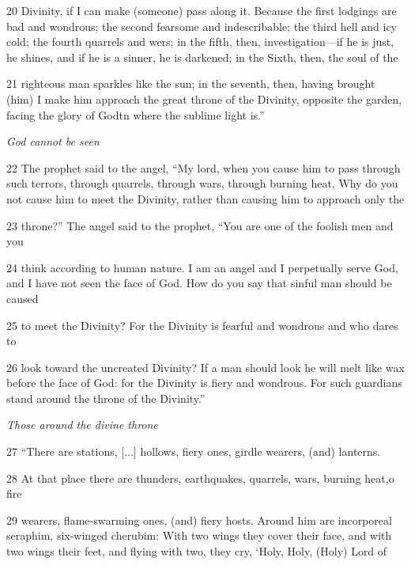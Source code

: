 \par 20 Divinity, if I can make (someone) pass along it. Because the first lodgings are bad and wondrous; the second fearsome and indescribable; the third hell and icy cold; the fourth quarrels and wers; in the fifth, then, investigation—if he is just, he shines, and if he is a sinner, he is darkened; in the Sixth, then, the soul of the

\par 21 righteous man sparkles like the sun; in the seventh, then, having brought (him) I make him approach the great throne of the Divinity, opposite the garden, facing the glory of Godtn where the sublime light is.”

\par \textit{God cannot be seen}

\par 22 The prophet said to the angel, “My lord, when you cause him to pass through such terrors, through quarrels, through wars, through burning heat, Why do you not cause him to meet the Divinity, rather than causing him to approach only the

\par 23 throne?” The angel said to the prophet, “You are one of the foolish men and you

\par 24 think according to human nature. I am an angel and I perpetually serve God, and I have not seen the face of God. How do you say that sinful man should be caused

\par 25 to meet the Divinity? For the Divinity is fearful and wondrous and who dares to

\par 26 look toward the uncreated Divinity? If a man should look he will melt like wax before the face of God: for the Divinity is fiery and wondrous. For such guardians stand around the throne of the Divinity.”

\par \textit{Those around the divine throne}

\par 27 “There are stations, [...] hollows, fiery ones, girdle wearers, (and) lanterns.

\par 28 At that place there are thunders, earthquakes, quarrels, wars, burning heat,o fire

\par 29 wearers, flame-swarming ones, (and) fiery hosts. Around him are incorporeal seraphim, six-winged cherubim: With two wings they cover their face, and with two wings their feet, and flying with two, they cry, ‘Holy, Holy, (Holy) Lord of

